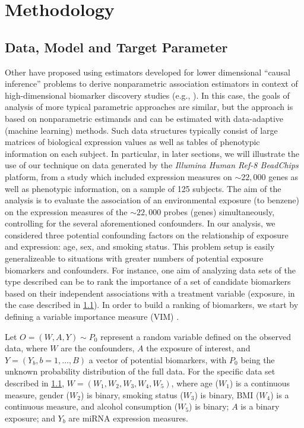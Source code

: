 \chapter{Methodology}

\section{Data, Model and Target Parameter}\label{data}

Other have proposed using estimators developed for lower dimensional ``causal
inference'' problems to derive nonparametric association estimators in context
of high-dimensional biomarker discovery studies (e.g.,
\cite{tuglus2011targeted}). In this case, the goals of analysis of more typical
parametric approaches are similar, but the approach is based on nonparametric
estimands and can be estimated with data-adaptive (machine learning) methods.
Such data structures typically consist of large matrices of biological
expression values as well as tables of phenotypic information on each subject.
In particular, in later sections, we will illustrate the use of our technique on
data generated by the \textit{Illumina Human Ref-8 BeadChips} platform, from a
study which included expression measures on $\sim 22,000$ genes as well as
phenotypic information, on a sample of 125 subjects. The aim of the analysis is
to evaluate the association of an environmental exposure (to benzene) on the
expression measures of the $\sim 22,000$ probes (genes) simultaneously,
controlling for the several aforementioned confounders. In our analysis, we
considered three potential confounding factors on the relationship of exposure
and expression: age, sex, and smoking status. This problem setup is easily
generalizeable to situations with greater numbers of potential exposure
biomarkers and confounders. For instance, one  aim of analyzing data sets of
the type described can be to rank the importance of a set of candidate
biomarkers based on their independent associations with a treatment variable
(exposure, in the case described in \ref{data}). In order to build a ranking of
biomarkers, we start by defining a variable importance measure (VIM)
\cite{van2011targeted}.

Let $O = (W, A, Y) \sim P_{0}$ represent a random variable defined on the
observed data, where $W$ are the confounders, $A$ the exposure of interest,
and $Y=(Y_b, b = 1, \dots, B)$ a vector of potential biomarkers, with $P_{0}$
being the unknown probability distribution of the full data. For the specific
data set described in \ref{data}, $W = (W_{1}, W_{2}, W_{3}, W_{4}, W_{5})$,
where age ($W_{1}$) is a continuous measure, gender ($W_{2}$) is binary,
smoking status ($W_{3}$) is binary, BMI ($W_{4}$) is a continuous measure, and
alcohol consumption ($W_{5}$) is binary; $A$ is a binary exposure; and $Y_{b}$
are miRNA expression measures.

